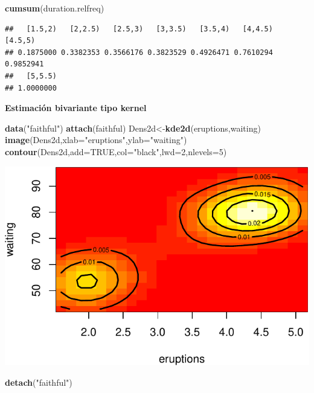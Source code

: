 \documentclass[]{article}
\newenvironment{Shaded}{\begin{snugshade}}{\end{snugshade}}
\newcommand{\KeywordTok}[1]{\textcolor[rgb]{0.13,0.29,0.53}{\textbf{{#1}}}}
\newcommand{\DataTypeTok}[1]{\textcolor[rgb]{0.13,0.29,0.53}{{#1}}}
\newcommand{\DecValTok}[1]{\textcolor[rgb]{0.00,0.00,0.81}{{#1}}}
\newcommand{\StringTok}[1]{\textcolor[rgb]{0.31,0.60,0.02}{{#1}}}
\newcommand{\OtherTok}[1]{\textcolor[rgb]{0.56,0.35,0.01}{{#1}}}
\newcommand{\NormalTok}[1]{{#1}}
\numberwithin{equation}{section}
\begin{document}
\begin{Shaded}
\begin{Highlighting}[]
\KeywordTok{cumsum}\NormalTok{(duration.relfreq)}
\end{Highlighting}
\end{Shaded}

\begin{verbatim}
##   [1.5,2)   [2,2.5)   [2.5,3)   [3,3.5)   [3.5,4)   [4,4.5)   [4.5,5) 
## 0.1875000 0.3382353 0.3566176 0.3823529 0.4926471 0.7610294 0.9852941 
##   [5,5.5) 
## 1.0000000
\end{verbatim}

\textbf{Estimación bivariante tipo kernel}

\begin{Shaded}
\begin{Highlighting}[]
\KeywordTok{data}\NormalTok{(}\StringTok{"faithful"}\NormalTok{)}
\KeywordTok{attach}\NormalTok{(faithful)}
\NormalTok{Dens2d<-}\KeywordTok{kde2d}\NormalTok{(eruptions,waiting)}
\KeywordTok{image}\NormalTok{(Dens2d,}\DataTypeTok{xlab=}\StringTok{"eruptions"}\NormalTok{,}\DataTypeTok{ylab=}\StringTok{"waiting"}\NormalTok{)}
\KeywordTok{contour}\NormalTok{(Dens2d,}\DataTypeTok{add=}\OtherTok{TRUE}\NormalTok{,}\DataTypeTok{col=}\StringTok{"black"}\NormalTok{,}\DataTypeTok{lwd=}\DecValTok{2}\NormalTok{,}\DataTypeTok{nlevels=}\DecValTok{5}\NormalTok{)}
\end{Highlighting}
\end{Shaded}

\includegraphics{tema1_files/figure-latex/unnamed-chunk-112-1.pdf}

\begin{Shaded}
\begin{Highlighting}[]
\KeywordTok{detach}\NormalTok{(}\StringTok{"faithful"}\NormalTok{)}
\end{Highlighting}
\end{Shaded}
\end{document}
